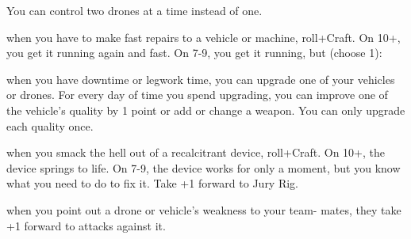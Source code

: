 \begin{dossier}
\begin{dossiermovebar}
                   You can control two drones at a time instead of one. 

                     when you have to make fast repairs to a vehicle or machine, roll+Craft. On 
                      10+, you get it running again and fast. On 7-9, you get it running, but (choose 1): 
\begin{moveoptions}


\end{moveoptions}
                       when you have downtime or legwork time, you can upgrade one of your 
                        vehicles or drones. For every day of time you spend upgrading, you can improve one of the 
                        vehicle’s quality by 1 point or add or change a weapon. You can only upgrade each quality 
                          once. 

                           when you smack the hell out of a recalcitrant device, 
                            roll+Craft. On 10+, the device springs to life. On 7-9, the device works for only a moment, 
                            but you know what you need to do to fix it. Take +1 forward to Jury Rig. 

                             when you point out a drone or vehicle’s weakness to your team- 
                                mates, they take +1 forward to attacks against it. 


\end{dossiermovebar}%
\end{dossier}

